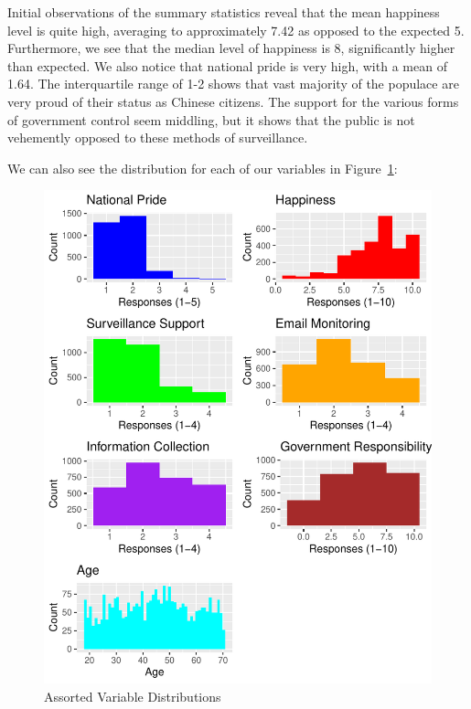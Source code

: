 \documentclass[
  letterpaper,
  DIV=11,
  numbers=noendperiod]{scrartcl}
\begin{document}
Initial observations of the summary statistics reveal that the mean
happiness level is quite high, averaging to approximately 7.42 as
opposed to the expected 5. Furthermore, we see that the median level of
happiness is 8, significantly higher than expected. We also notice that
national pride is very high, with a mean of 1.64. The interquartile
range of 1-2 shows that vast majority of the populace are very proud of
their status as Chinese citizens. The support for the various forms of
government control seem middling, but it shows that the public is not
vehemently opposed to these methods of surveillance.

We can also see the distribution for each of our variables in
Figure~\ref{fig-distgraphs}:

\begin{figure}

{\centering \includegraphics{paper_files/figure-pdf/fig-distgraphs-1.pdf}

}

\caption{\label{fig-distgraphs}Assorted Variable Distributions}

\end{figure}
\end{document}
